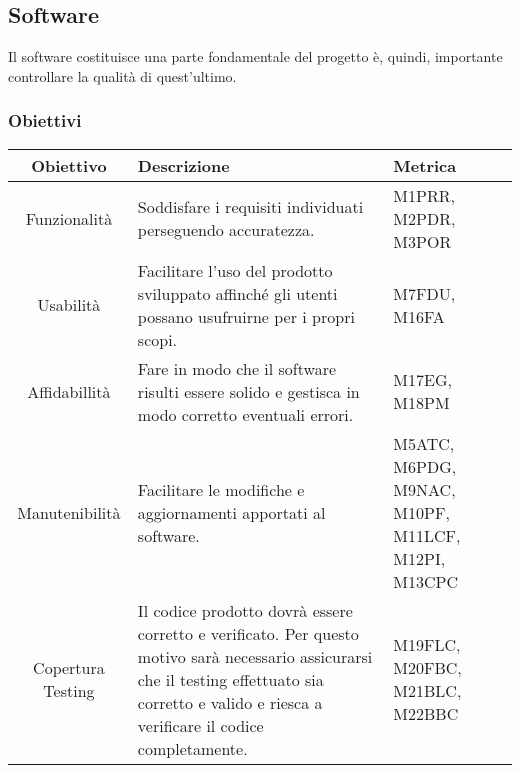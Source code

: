 \subsection{Software}
Il software costituisce una parte fondamentale del progetto è, quindi, importante controllare la qualità di quest'ultimo.

\subsubsection{Obiettivi}
\begin{center}
	\renewcommand{\arraystretch}{1.8}
	\begin{tabular}{ |c|m{20em}|m{8em}|}
		\hline
		\textbf{Obiettivo} & \textbf{Descrizione} & \textbf{Metrica} \\
		\hline
		Funzionalità & Soddisfare i requisiti individuati \newline perseguendo accuratezza. & M1PRR, M2PDR, M3POR \\
		\hline
		Usabilità & Facilitare l'uso del prodotto sviluppato affinché gli utenti possano usufruirne per i propri scopi. & M7FDU, M16FA \\
    \hline
		Affidabillità & Fare in modo che il software risulti essere solido e gestisca in modo corretto eventuali errori. & M17EG, M18PM \\
		\hline
		Manutenibilità & Facilitare le modifiche e aggiornamenti \newline apportati al software. & M5ATC, M6PDG, M9NAC, M10PF, M11LCF, M12PI, M13CPC \\
		\hline
    Copertura Testing & Il codice prodotto dovrà essere corretto \newline e verificato. Per questo motivo sarà \newline necessario assicurarsi che il testing 
    \newline effettuato sia corretto e valido e riesca a \newline verificare il codice completamente. & M19FLC, M20FBC, M21BLC, M22BBC \\
		\hline
	\end{tabular}
\end{center}


